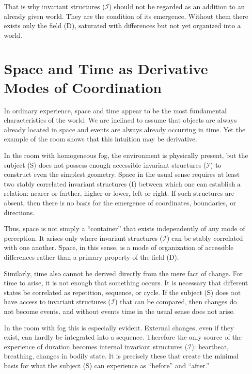 \documentclass[aps,prd,onecolumn,nofootinbib,superscriptaddress]{revtex4-2} %
\begin{document}
    That is why invariant structures ($\mathcal{I}$) should not be regarded as an addition to an already given world. They are the condition of its emergence. Without them there exists only the field (D), saturated with differences but not yet organized into a world.


    \section{Space and Time as Derivative Modes of Coordination}
    In ordinary experience, space and time appear to be the most fundamental characteristics of the world. We are inclined to assume that objects are always already located in space and events are always already occurring in time. Yet the example of the room shows that this intuition may be derivative.

    In the room with homogeneous fog, the environment is physically present, but the subject (S) does not possess enough accessible invariant structures ($\mathcal{I}$) to construct even the simplest geometry. Space in the usual sense requires at least two stably correlated invariant structures (I) between which one can establish a relation: nearer or farther, higher or lower, left or right. If such structures are absent, then there is no basis for the emergence of coordinates, boundaries, or directions.

    Thus, space is not simply a “container” that exists independently of any mode of perception. It arises only where invariant structures ($\mathcal{I}$) can be stably correlated with one another. Space, in this sense, is a mode of organization of accessible differences rather than a primary property of the field (D).

    Similarly, time also cannot be derived directly from the mere fact of change. For time to arise, it is not enough that something occurs. It is necessary that different states be correlated as repetition, sequence, or cycle. If the subject (S) does not have access to invariant structures ($\mathcal{I}$) that can be compared, then changes do not become events, and without events time in the usual sense does not arise.

    In the room with fog this is especially evident. External changes, even if they exist, can hardly be integrated into a sequence. Therefore the only source of the experience of duration becomes internal invariant structures ($\mathcal{I}$): heartbeat, breathing, changes in bodily state. It is precisely these that create the minimal basis for what the subject (S) can experience as “before” and “after.”
\end{document}
